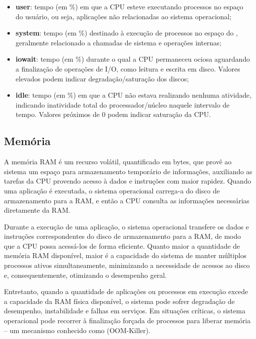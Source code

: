 \begin{itemize}
\item \textbf{user}: tempo (em \%) em que a CPU esteve executando processos no espaço do usuário, ou seja, aplicações não relacionadas ao sistema operacional;

\item \textbf{system}: tempo (em \%) destinado à execução de processos no espaço do , geralmente relacionado a chamadas de sistema e operações internas;

\item \textbf{iowait}: tempo (em \%) durante o qual a CPU permaneceu ociosa aguardando a finalização de operações de I/O, como leitura e escrita em disco. Valores elevados podem indicar degradação/saturação dos discos;

\item \textbf{idle}: tempo (em \%) em que a CPU não estava realizando nenhuma atividade, indicando inatividade total do processador/núcleo naquele intervalo de tempo. Valores próximos de 0 podem indicar saturação da CPU.
\end{itemize}

\subsection{Memória}
\label{subsection:Memoria}

A memória RAM \citep{memorymetrics2025} é um recurso volátil, quantificado em bytes, que provê ao sistema um espaço para armazenamento temporário de informações, auxiliando as tarefas da CPU provendo acesso à dados e instruções com maior rapidez. Quando uma aplicação é executada, o sistema operacional carrega-a do disco de armazenamento para a RAM, e então a CPU consulta as informações necessárias diretamente da RAM. 

Durante a execução de uma aplicação, o sistema operacional transfere os dados e instruções correspondentes do disco de armazenamento para a RAM, de modo que a CPU possa acessá-los de forma eficiente. Quanto maior a quantidade de memória RAM disponível, maior é a capacidade do sistema de manter múltiplos processos ativos simultaneamente, minimizando a necessidade de acessos ao disco e, consequentemente, otimizando o desempenho geral.

Entretanto, quando a quantidade de aplicações ou processos em execução excede a capacidade da RAM física disponível, o sistema pode sofrer degradação de desempenho, instabilidade e falhas em serviços. Em situações críticas, o sistema operacional pode recorrer à finalização forçada de processos para liberar memória -- um mecanismo conhecido como  (OOM-Killer).

